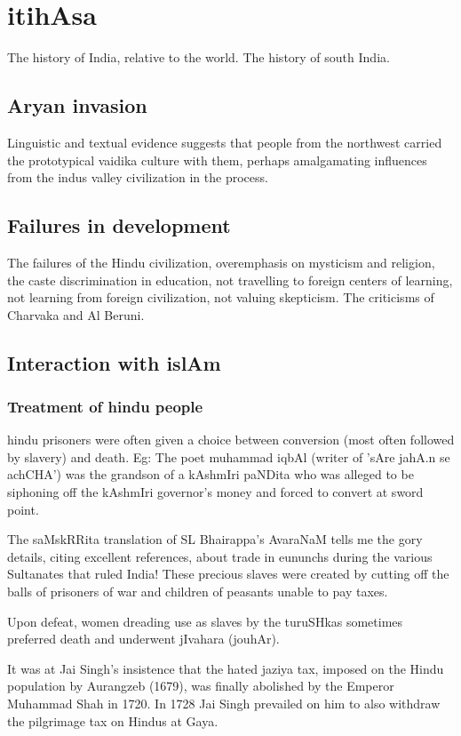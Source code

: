 \documentclass[oneside, article]{memoir}
\begin{document}
\section{itihAsa}
The history of India, relative to the world. The history of south India.

\subsection{Aryan invasion}
Linguistic and textual evidence suggests that people from the northwest carried the prototypical vaidika culture with them, perhaps amalgamating influences from the indus valley civilization in the process.

\subsection{Failures in development}
The failures of the Hindu civilization, overemphasis on mysticism and religion, the caste discrimination in education, not travelling to foreign centers of learning, not learning from foreign civilization, not valuing skepticism. The criticisms of Charvaka and Al Beruni.

\subsection{Interaction with islAm}
\subsubsection{Treatment of hindu people}
hindu prisoners were often given a choice between conversion (most often followed by slavery) and death. Eg: The poet muhammad iqbAl (writer of 'sAre jahA.n se achCHA') was the grandson of a kAshmIri paNDita who was alleged to be siphoning off the kAshmIri governor's money and forced to convert at sword point.

The saMskRRita translation of SL Bhairappa's AvaraNaM tells me the gory details, citing excellent references, about trade in eununchs during the various Sultanates that ruled India! These precious slaves were created
by cutting off the balls of prisoners of war and children of peasants unable to pay taxes.

Upon defeat, women dreading use as slaves by the turuSHkas sometimes preferred death and underwent jIvahara (jouhAr).

It was at Jai Singh’s insistence that the hated jaziya tax, imposed on the Hindu population by Aurangzeb (1679), was finally abolished by the Emperor Muhammad Shah in 1720. In 1728 Jai Singh prevailed on him to also withdraw the pilgrimage tax on Hindus at Gaya.
\end{document}
